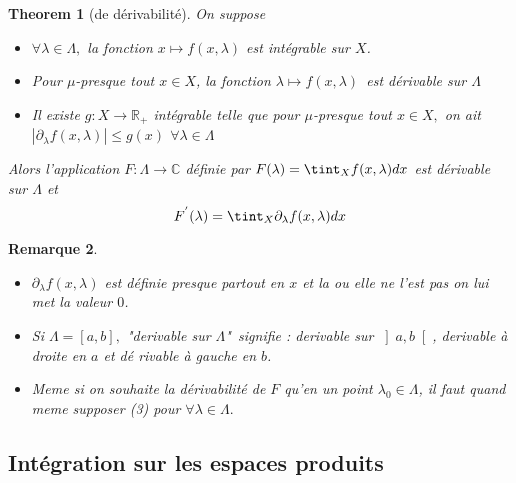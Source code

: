 \documentclass[3pt]{article}
\newtheorem{theorem}{Theorem}
\newtheorem{remark}[theorem]{Remarque}
\begin{document}
\bigskip

\begin{theorem}[de d\'{e}rivabilit\'{e}]
On suppose

\begin{itemize}
\item $\forall \lambda \in \Lambda ,$ la fonction $x\longmapsto f(x,\lambda
) $ est int\'{e}grable sur $X$.

\item Pour $\mu $-presque tout $x\in X$, la fonction $\lambda \longmapsto
f(x,\lambda )$\ est d\'{e}rivable sur $\Lambda $

\item Il existe $g:X\rightarrow \mathbb{R}_{+}$ int\'{e}grable telle que
pour $\mu $-presque tout $x\in X,$ on ait $\left\vert \partial _{\lambda
}f(x,\lambda )\right\vert \leq g(x)$ $\forall \lambda \in \Lambda $
\end{itemize}

Alors l'application $F:\Lambda \rightarrow \mathbb{C}$ d\'{e}finie par $%
F(\lambda )=\tint_{X}f(x,\lambda )dx$ est d\'{e}rivable sur $\Lambda $ et 
\begin{equation*}
F^{^{\prime }}(\lambda )=\tint_{X}\partial _{\lambda }f(x,\lambda )dx
\end{equation*}
\end{theorem}

\bigskip

\begin{remark}
\begin{itemize}
\item $\partial _{\lambda }f(x,\lambda )$ est d\'{e}finie presque partout en 
$x$ et la ou elle ne l'est pas on lui met la valeur $0$.

\item Si $\Lambda =\left[ a,b\right] ,$ "derivable sur $\Lambda $"\ signifie
: derivable sur $\left] a,b\right[ $, derivable \`{a} droite en $a$ et d\'{e}%
rivable \`{a} gauche en $b$.

\item Meme si on souhaite la d\'{e}rivabilit\'{e} de $F$ qu'en un point $%
\lambda _{0}\in \Lambda $, il faut quand meme supposer (3) pour $\forall
\lambda \in \Lambda .$
\end{itemize}
\end{remark}

\bigskip

\bigskip 

\subsection{Int\'{e}gration sur les espaces produits}
\end{document}
